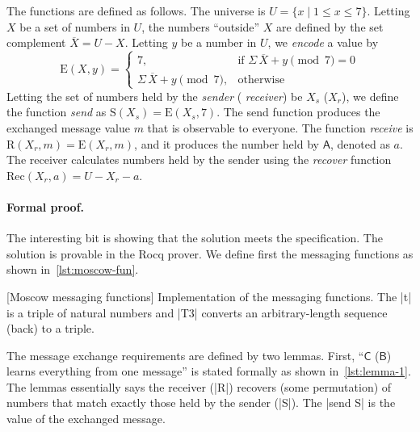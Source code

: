 The functions are defined as follows. The universe is \(U = \{ x \mid 1 \leq x
\leq 7 \}\). Letting \(X\) be a set of numbers in \(U\), the numbers
\enquote{outside} \(X\) are defined by the set complement \(\overline{X} = U -
X\). Letting \(y\) be a number in \(U\), we \emph{encode} a value by
\[\text{E}(X, y) = \begin{cases} 7, & \text{if } \Sigma\,\overline{X} +
y\pmod{7} = 0 \\ \Sigma\,\overline{X} + y\pmod{7}, & \text{otherwise}
\end{cases}\] Letting the set of numbers held by the \emph{sender} (\resp
\emph{receiver}) be \(X_s\) (\resp \(X_r\)), we define the function \emph{send}
as \(\text{S}(X_s) = \text{E}(X_s, 7)\). The send function produces the
exchanged message value \(m\) that is observable to everyone. The function
\emph{receive} is \(\text{R}(X_r,m) = \text{E}(X_r, m)\), and it produces the
number held by \(\mathsf{A}\), denoted as \(a\). The receiver calculates numbers
held by the sender using the \emph{recover} function \(\text{Rec}(X_r, a) = U -
X_r - a\).

\paragraph{Formal proof.}
The interesting bit is showing that the solution meets the specification.
The solution is provable in the Rocq prover.
We define first the messaging functions as shown in~\autoref{lst:moscow-fun}.

\begin{center}
\begin{minipage}{\textwidth}
\captionsetup{type=lstlisting}
[Moscow messaging functions]{
   Implementation of the messaging functions. The \pr|t| is a triple of natural
   numbers and \pr|T3| converts an arbitrary-length sequence (back) to a
   triple.}
\label{lst:moscow-fun}
\end{minipage}
\end{center}

The message exchange requirements are defined by two lemmas. First,
\enquote{\(\mathsf{C}\) (\resp \(\mathsf{B}\)) learns everything from one
message} is stated formally as shown in~\autoref{lst:lemma-1}. The lemmas
essentially says the receiver (\pr|R|) recovers (some permutation) of numbers
that match exactly those held by the sender (\pr|S|). The \pr|send S| is the
value of the exchanged message.


